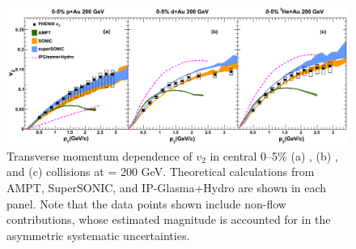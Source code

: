 \begin{figure}[!ht]
\begin{center}
\includegraphics[width=1.0\linewidth]{figs/indepth_theory_comparison.png}
\caption{Transverse momentum dependence of $v_2$ in central 0--5\% (a) \pau, (b) \dau, and (c) \hau collisions at \sqsn = 200 GeV. Theoretical calculations from AMPT, SuperSONIC, and IP-Glasma+Hydro are shown in each panel. Note that the data points shown include non-flow contributions, whose estimated magnitude is accounted for in the asymmetric systematic uncertainties.}
\label{fig:indepth_comp_three}
\end{center}
\end{figure}

